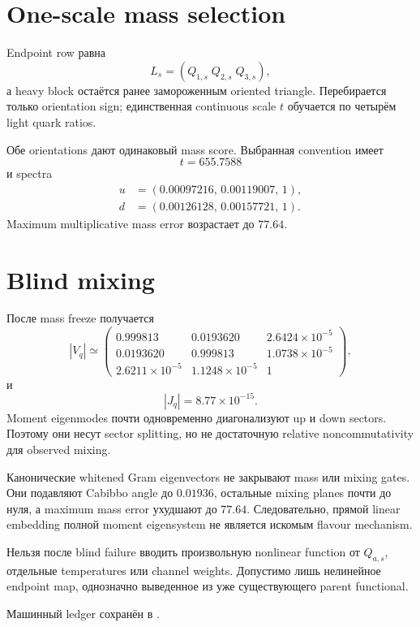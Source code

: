\section{One-scale mass selection}

Endpoint row равна
\begin{equation}
 L_s=(Q_{1,s}\;Q_{2,s}\;Q_{3,s}),
\end{equation}
а heavy block остаётся ранее замороженным oriented triangle. Перебирается
только orientation sign; единственная continuous scale $t$ обучается по
четырём light quark ratios.

Обе orientations дают одинаковый mass score. Выбранная convention имеет
\begin{equation}
 t=655.7588
\end{equation}
и spectra
\begin{align}
 u&=(0.00097216,\,0.00119007,\,1),\\
 d&=(0.00126128,\,0.00157721,\,1).
\end{align}
Maximum multiplicative mass error возрастает до $77.64$.

\section{Blind mixing}

После mass freeze получается
\begin{equation}
 |V_q|\simeq
 \begin{pmatrix}
 0.999813&0.0193620&2.6424\times10^{-5}\\
 0.0193620&0.999813&1.0738\times10^{-5}\\
 2.6211\times10^{-5}&1.1248\times10^{-5}&1
 \end{pmatrix},
\end{equation}
и
\begin{equation}
 |J_q|=8.77\times10^{-15}.
\end{equation}
Moment eigenmodes почти одновременно диагонализуют up и down sectors. Поэтому
они несут sector splitting, но не достаточную relative noncommutativity для
observed mixing.

\begin{theorem}
Канонические whitened Gram eigenvectors не закрывают mass или mixing gates.
Они подавляют Cabibbo angle до $0.01936$, остальные mixing planes почти до
нуля, а maximum mass error ухудшают до $77.64$. Следовательно, прямой linear
embedding полной moment eigensystem не является искомым flavour mechanism.
\end{theorem}

\begin{nogocriterion}
Нельзя после blind failure вводить произвольную nonlinear function от
$Q_{a,s}$, отдельные temperatures или channel weights. Допустимо лишь
нелинейное endpoint map, однозначно выведенное из уже существующего parent
functional.
\end{nogocriterion}

Машинный ledger сохранён в
.